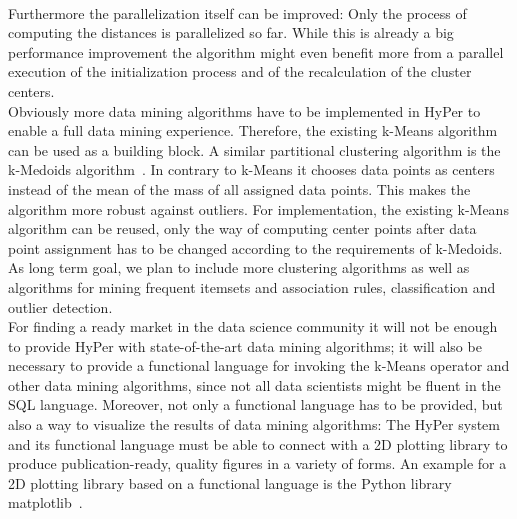 \\
Furthermore the parallelization itself can be improved: Only the process of computing the distances is parallelized so far. While this is already a big performance improvement the algorithm might even benefit more from a parallel execution of the initialization process and of the recalculation of the cluster centers.
\\
Obviously more data mining algorithms have to be implemented in HyPer to enable a full data mining experience. Therefore, the existing k-Means algorithm can be used as a building block. A similar partitional clustering algorithm is the k-Medoids algorithm~\parencite{medoid}. In contrary to k-Means it chooses data points as centers instead of the mean of the mass of all assigned data points. This makes the algorithm more robust against outliers. For implementation, the existing k-Means algorithm can be reused, only the way of computing center points after data point assignment has to be changed according to the requirements of k-Medoids. As long term goal, we plan to include more clustering algorithms as well as algorithms for mining frequent itemsets and association rules, classification and outlier detection.
\\
For finding a ready market in the data science community it will not be enough to provide HyPer with state-of-the-art data mining algorithms; it will also be necessary to provide a functional language for invoking the k-Means operator and other data mining algorithms, since not all data scientists might be fluent in the SQL language. Moreover, not only a functional language has to be provided, but also a way to visualize the results of data mining algorithms: The HyPer system and its functional language must be able to connect with a 2D plotting library to produce publication-ready, quality figures in a variety of forms. An example for a 2D plotting library based on a functional language is the Python library matplotlib~\parencite{Hunter:2007}. 





